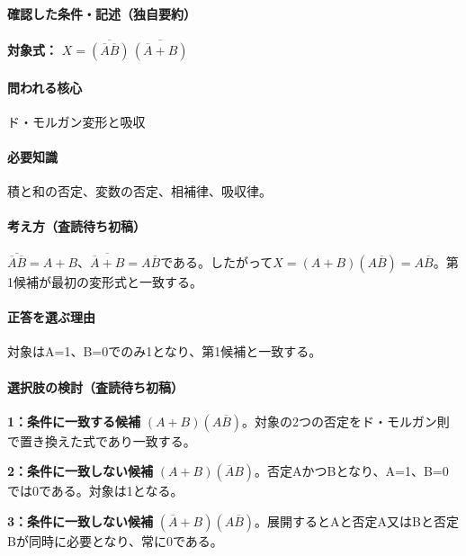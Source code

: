 \paragraph{確認した条件・記述（独自要約）}\mbox{}\par

\noindent\textbf{対象式：} \(X=\overline{(\overline A\overline B)}\,\overline{(\overline A+B)}\)\par

\paragraph{問われる核心} ド・モルガン変形と吸収

\paragraph{必要知識} 積と和の否定、変数の否定、相補律、吸収律。

\paragraph{考え方（査読待ち初稿）} \(\overline{\overline A\overline B}=A+B\)、\(\overline{\overline A+B}=A\overline B\)である。したがって\(X=(A+B)(A\overline B)=A\overline B\)。第1候補が最初の変形式と一致する。

\paragraph{正答を選ぶ理由} 対象はA=\allowbreak{}1、B=\allowbreak{}0でのみ1となり、第1候補と一致する。

\paragraph{選択肢の検討（査読待ち初稿）}\mbox{}\par

\noindent\textbf{1：条件に一致する候補} \((A+B)(A\overline B)\)。対象の2つの否定をド・モルガン則で置き換えた式であり一致する。\par

\noindent\textbf{2：条件に一致しない候補} \((A+B)(\overline A B)\)。否定AかつBとなり、A=\allowbreak{}1、B=\allowbreak{}0では0である。対象は1となる。\par

\noindent\textbf{3：条件に一致しない候補} \((\overline A+B)(A\overline B)\)。展開するとAと否定A又はBと否定Bが同時に必要となり、常に0である。\par

